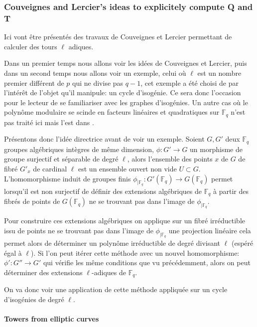 \documentclass[10pt,a4paper]{book}
\theoremstyle{plain}
\theoremstyle{definition}
\theoremstyle{definition}
\theoremstyle{definition}
\theoremstyle{definition}
\theoremstyle{remark}
\theoremstyle{remark}
\begin{document}
\subsubsection{Couveignes and Lercier's ideas to explicitely compute Q and T}
Ici vont être présentés des travaux de Couveignes et Lercier \cite{couveignesLercier2013} permettant de calculer des tours $\ell$ adiques.

Dans un premier temps nous allons voir les idées de Couveignes et Lercier, puis dans un second temps nous allons voir un exemple, celui où $\ell$ est un nombre premier différent de $p$ qui ne divise pas $q-1$, cet exemple a été choisi de par l'intérêt de l'objet qu'il manipule: un cycle d'isogénie. Ce sera donc l'occasion pour le lecteur de se familiariser avec les graphes d'isogénies. Un autre cas où le polynôme modulaire se scinde en facteurs linéaires et quadratiques sur $\mathbb{F}_q$ n'est pas traité ici mais l'est dans \cite{DeFeo-Doliskani-Schost13}.

Présentons donc l'idée directrice avant de voir un exemple. Soient $G,G'$ deux $\mathbb{F}_q$ groupes algébriques intègres de même dimension, $\phi: G' \to G$ un morphisme de groupe surjectif et séparable de degré $\ell$, alors l'ensemble des points $x$ de $G$ de fibré $G'_x$ de cardinal $\ell$ est un ensemble ouvert non vide $U \subset G$. 
L'homomorphisme induit de groupes finis $\phi_{\mid \mathbb{F}_q}: G'(\mathbb{F}_q) \to G(\mathbb{F}_q)$ permet lorsqu'il est non surjectif de définir des extensions algébriques de $\mathbb{F}_q$ à partir des fibrés de points de $G(\mathbb{F}_q)$ ne se trouvant pas dans l'image de $\phi_{\mid \mathbb{F}_q}$. 

Pour construire ces extensions algébriques on applique sur un fibré irréductible issu de points ne se trouvant pas dans l'image de $\phi_{\mid \mathbb{F}_q}$ une projection linéaire cela permet alors de  déterminer un polynôme irréductible de degré divisant $\ell$ (espéré égal à $\ell$). Si l'on peut itérer cette méthode avec un nouvel homomorphisme: $\phi':G'' \to G'$ qui vérifie les même conditions que vu précédemment, alors on peut déterminer des extensions $\ell$-adiques de $\mathbb{F}_q$.

On va donc voir une application de cette méthode appliquée sur un cycle d'isogénies de degré $\ell$.

\paragraph{Towers from elliptic curves}
\end{document}
